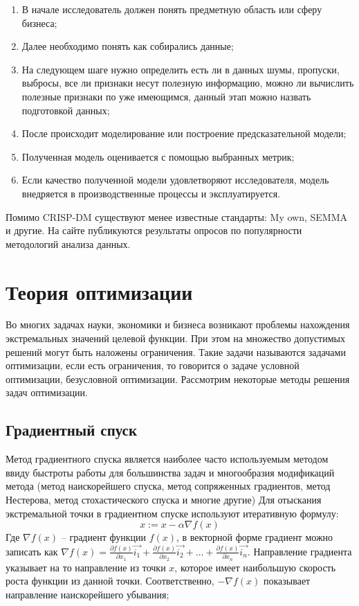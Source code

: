 \begin{enumerate}[label=\arabic*.]
    \item В начале исследователь должен понять предметную область или сферу бизнеса;
    \item Далее необходимо понять как собирались данные;
    \item На следующем шаге нужно определить есть ли в данных шумы, пропуски, выбросы, все ли признаки несут полезную информацию, можно ли вычислить полезные признаки по уже имеющимся, данный этап можно назвать подготовкой данных;
    \item После происходит моделирование или построение предсказательной модели;
    \item Полученная модель оценивается с помощью выбранных метрик;
    \item Если качество полученной модели удовлетворяют исследователя, модель внедряется в производственные процессы и эксплуатируется.
\end{enumerate}
Помимо CRISP-DM существуют менее известные стандарты: My own, SEMMA и другие. На сайте \cite{poll:crisp_dm} публикуются результаты опросов по популярности методологий анализа данных.



\section{Теория оптимизации}

Во многих задачах науки, экономики и бизнеса возникают проблемы нахождения экстремальных значений целевой функции. При этом на множество допустимых решений могут быть наложены ограничения. Такие задачи называются задачами оптимизации, если есть ограничения, то говорится о задаче условной оптимизации, безусловной оптимизации. Рассмотрим некоторые методы решения задач оптимизации.

\subsection{Градиентный спуск}

Метод градиентного спуска является наиболее часто используемым методом ввиду быстроты работы для большинства задач и многообразия модификаций метода (метод наискорейшего спуска, метод сопряженных градиентов, метод Нестерова, метод стохастического спуска и многие другие)
Для отыскания экстремальной точки в градиентном спуске используют итеративную формулу:
$$ x := x - \alpha \nabla f(x) $$
Где $\nabla f(x)$ -- градиент функции $f(x)$, в векторной форме градиент можно записать как $\nabla f(x) = \frac{\partial f(x)}{\partial x_1} \vec{i_1} + \frac{\partial f(x)}{\partial x_2} \vec{i_2} + \dots + \frac{\partial f(x)}{\partial x_n} \vec{i_n}$. Направление градиента указывает на то направление из точки $x$, которое имеет наибольшую скорость роста функции из данной точки. Соответственно, $-\nabla f(x)$ показывает направление наискорейшего убывания;

